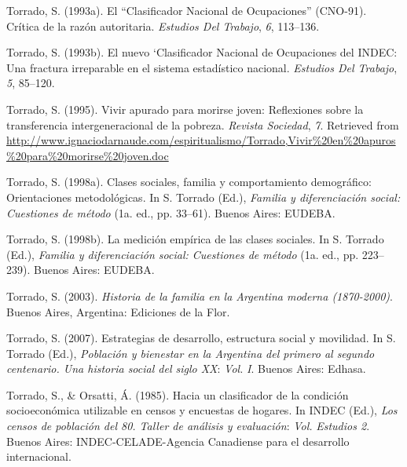 \documentclass[
]{article}
\newlength{\cslhangindent}
\newlength{\cslentryspacingunit} %
\newenvironment{CSLReferences}[2] %
 {%
  \setlength{\parindent}{0pt}
  \ifodd #1
  \let\oldpar\par
  \def\par{\hangindent=\cslhangindent\oldpar}
  \fi
  \setlength{\parskip}{#2\cslentryspacingunit}
 }%
 {}
\begin{document}
\begin{CSLReferences}{1}{0}
\leavevmode{}%
Torrado, S. (1993a). El {``{Clasificador} {Nacional} de {Ocupaciones}''} ({CNO}-91). {Crítica} de la razón autoritaria. \emph{Estudios Del Trabajo}, \emph{6}, 113--136.

\leavevmode{}%
Torrado, S. (1993b). El nuevo `{Clasificador} {Nacional} de {Ocupaciones} del {INDEC}: Una fractura irreparable en el sistema estadístico nacional. \emph{Estudios Del Trabajo}, \emph{5}, 85--120.

\leavevmode{}%
Torrado, S. (1995). Vivir apurado para morirse joven: Reflexiones sobre la transferencia intergeneracional de la pobreza. \emph{Revista Sociedad}, \emph{7}. Retrieved from \url{http://www.ignaciodarnaude.com/espiritualismo/Torrado,Vivir\%20en\%20apuros\%20para\%20morirse\%20joven.doc}

\leavevmode{}%
Torrado, S. (1998a). Clases sociales, familia y comportamiento demográfico: Orientaciones metodológicas. In S. Torrado (Ed.), \emph{Familia y diferenciación social: Cuestiones de método} (1a. ed., pp. 33--61). Buenos Aires: EUDEBA.

\leavevmode{}%
Torrado, S. (1998b). La medición empírica de las clases sociales. In S. Torrado (Ed.), \emph{Familia y diferenciación social: Cuestiones de método} (1a. ed., pp. 223--239). Buenos Aires: EUDEBA.

\leavevmode{}%
Torrado, S. (2003). \emph{Historia de la familia en la {Argentina} moderna (1870-2000)}. Buenos Aires, Argentina: Ediciones de la Flor.

\leavevmode{}%
Torrado, S. (2007). Estrategias de desarrollo, estructura social y movilidad. In S. Torrado (Ed.), \emph{Población y bienestar en la {Argentina} del primero al segundo centenario. {Una} historia social del siglo {XX}}: \emph{Vol.} \emph{I}. Buenos Aires: Edhasa.

\leavevmode{}%
Torrado, S., \& Orsatti, Á. (1985). Hacia un clasificador de la condición socioeconómica utilizable en censos y encuestas de hogares. In INDEC (Ed.), \emph{Los censos de población del 80. {Taller} de análisis y evaluación}: \emph{Vol.} \emph{Estudios 2}. Buenos Aires: INDEC-CELADE-Agencia Canadiense para el desarrollo internacional.


\end{CSLReferences}
\end{document}
